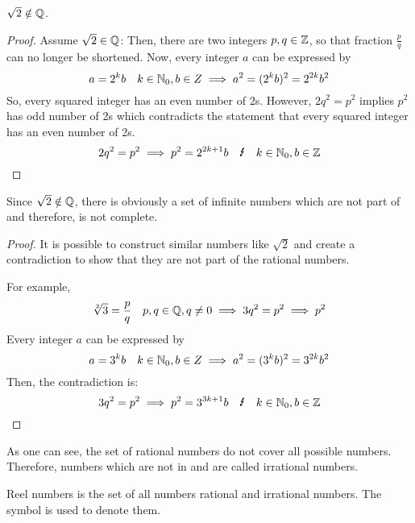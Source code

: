 \begin{lemma}
    $\sqrt{2} \notin \mathbb{Q}$.
\end{lemma}
\begin{proof}
    Assume $\sqrt{2} \in \mathbb{Q}$:
    Then, there are two integers $p,q \in \mathbb{Z}$, so that fraction $\frac{p}{q}$ 
    can no longer be shortened.
    Now, every integer $a$ can be expressed by 
    \begin{equation}
        a = 2^k b \quad k \in \mathbb{N}_0, b \in Z \implies a^2 = (2^k b)^2 = 2^{2k} b^2
    \end{equation}
    So, every squared integer has an even number of 2s.
    However, $2 q^2 = p^2$ implies $p^2$ has odd number of 2s which contradicts the statement 
    that every squared integer has an even number of 2s.
    \begin{equation}
        2 q^2 = p^2 \implies p^2 = 2^{2k+1} b \quad \blitz  \quad k \in \Nzero, b \in \Z
    \end{equation}
\end{proof}
\begin{corollary}
    Since $\sqrt{2} \notin \mathbb{Q}$, there is obviously a set of infinite numbers which are not part of 
    \Q{} and therefore, \Q{} is not complete.
\end{corollary}
\begin{proof}
    It is possible to construct similar numbers like $\sqrt{2}$ and create a contradiction to show
    that they are not part of the rational numbers.

    For example,
    \begin{equation}
        \sqrt[2]{3} = \frac{p}{q} \quad p,q \in \mathbb{Q}, q \ne 0 \implies 3 q^2 = p^2 \implies p^2 
    \end{equation}
    Every integer $a$ can be expressed by 
    \begin{equation}
        a = 3^k b \quad k \in \mathbb{N}_0, b \in Z \implies a^2 = (3^k b)^2 = 3^{2k} b^2
    \end{equation}
    Then, the contradiction is:
    \begin{equation}
        3 q^2 = p^2 \implies p^2 = 3^{3k+1} b \quad \blitz  \quad k \in \Nzero, b \in \Z
    \end{equation}
\end{proof}

\begin{definition}
    As one can see, the set of rational numbers do not cover all possible numbers.
    Therefore, numbers which are not in \Q{} and are called irrational numbers.
\end{definition}

\begin{definition}
    Reel numbers is the set of all numbers rational and irrational numbers.
    The symbol \R{} is used to denote them.
\end{definition}

